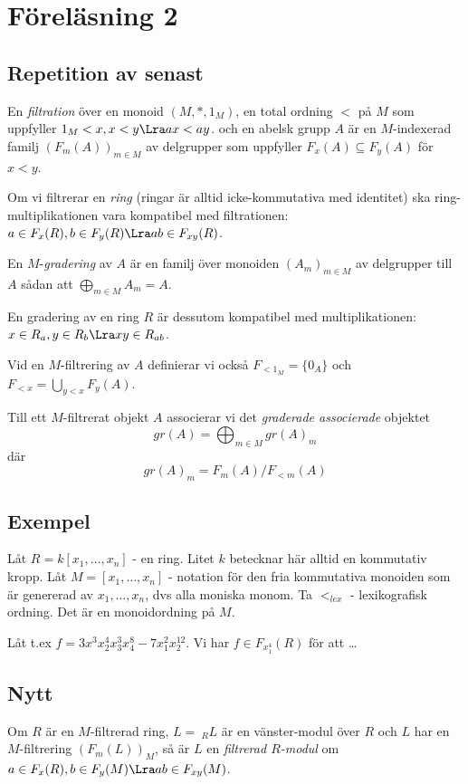 
\section{Föreläsning 2}

\subsection{Repetition av senast}
En \textit{filtration} över
en monoid $(M, *, 1_M)$, en total ordning $<$ på $M$
som uppfyller $1_M < x, x < y \Lra ax < ay$.
och en abelsk grupp $A$
är en $M$-indexerad familj
$(F_m(A))_{m\in M}$ av delgrupper som uppfyller
$F_x(A) \subseteq F_y(A)$ för $x < y$.

Om vi filtrerar en \textit{ring}
(ringar är alltid icke-kommutativa med identitet)
ska ring-multiplikationen vara kompatibel med 
filtrationen:
$a\in F_x(R), b\in F_y(R) \Lra ab \in F_{xy}(R)$.

\smallLine

En $M$-\textit{gradering} av $A$ är en familj 
över monoiden
$(A_m)_{m\in M}$
av delgrupper till $A$ sådan att 
$\bigoplus_{m\in M} A_m = A$.

\smallLine
En gradering av en ring $R$ är dessutom 
kompatibel med multiplikationen: 
$x\in R_a, y \in R_b \Lra xy \in R_{ab}$.

\smallLine

Vid en $M$-filtrering av $A$ definierar vi också
$F_{<1_M} = \{0_A\}$ och 
$F_{<x} = \bigcup_{y<x}F_y(A)$.

Till ett $M$-filtrerat objekt $A$ associerar vi 
det \textit{graderade associerade} objektet
\[gr(A) = \bigoplus_{m\in M} gr(A)_m\]
där 
\[gr(A)_m = F_{m}(A) / F_{<m}(A)\]

\subsection{Exempel}
Låt $R = k[x_1,\ldots, x_n]$ - en ring.
Litet $k$ betecknar här alltid en 
kommutativ kropp.
Låt $M = [x_1, \ldots, x_n]$ - notation
för den fria kommutativa monoiden som är 
genererad av $x_1, \ldots, x_n$,
dvs alla moniska monom. Ta
$<_{lex}$ - lexikografisk ordning. Det är en
monoidordning på $M$.


Låt t.ex $f = 3x^3 x_2^4 x_3^3x_4^8 - 7x_1^2x_2^{12}$.
Vi har $f \in F_{x_1^4}(R)$ för att \ldots

\subsection{Nytt}
Om $R$ är en $M$-filtrerad ring, $L = {\ }_RL$ är en vänster-modul
över $R$ och $L$ har en $M$-filtrering
$(F_m(L))_M$, så är $L$ en \textit{filtrerad $R$-modul} om
$a\in F_x(R), b\in F_y(M) \Lra ab\in F_{xy}(M)$.

